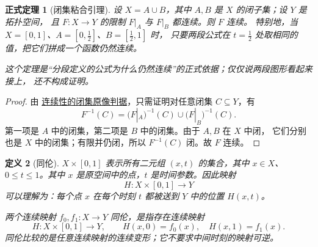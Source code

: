 \documentclass[UTF8,fontset=none,a4paper,11pt]{ctexart}
\theoremstyle{foundation-definition}
\newtheorem{definition}{定义}[section]
\theoremstyle{foundation-theorem}
\newtheorem{theorem}[definition]{正式定理}
\theoremstyle{foundation-proposition}
\theoremstyle{foundation-example}
\theoremstyle{foundation-remark}
\theoremstyle{foundation-theorem}
\newcommand{\term}[2]{\hyperref[#1]{#2}}
\begin{document}
\begin{theorem}[闭集粘合引理]
\label{thm:pasting-lemma}
设 $X=A\cup B$，其中 $A,B$ 是 $X$ 的闭子集；设 $Y$ 是拓扑空间，
且 $F:X\to Y$ 的限制 $F|_A$ 与 $F|_B$ 都连续。则 $F$ 连续。
特别地，当 $X=[0,1]$、$A=[0,\tfrac12]$、$B=[\tfrac12,1]$ 时，
只要两段公式在 $t=\tfrac12$ 处取相同的值，把它们拼成一个函数仍然连续。

这个定理是“分段定义的公式为什么仍然连续”的正式依据；仅仅说两段图形看起来接上，
还不构成证明。
\end{theorem}

\begin{proof}
由 \term{prop:continuous-closed-preimage}{连续性的闭集原像判据}，只需证明对任意闭集 $C\subseteq Y$，有
\[
 F^{-1}(C)=\bigl(F|_A\bigr)^{-1}(C)\cup\bigl(F|_B\bigr)^{-1}(C).
\]
第一项是 $A$ 中的闭集，第二项是 $B$ 中的闭集。由于 $A,B$ 在 $X$ 中闭，
它们分别也是 $X$ 中的闭集；有限并仍闭，所以 $F^{-1}(C)$ 闭。故 $F$ 连续。
\end{proof}

\begin{definition}[同伦]\label{def:homotopy}
\(X\times[0,1]\) 表示所有二元组 \((x,t)\) 的集合，其中 \(x\in X\)、\(0\leq t\leq1\)。其中 \(x\) 是原空间中的点，\(t\) 是时间参数。因此映射
\[
H:X\times[0,1]\to Y
\]
可以理解为：每个点 \(x\) 在每个时刻 \(t\) 都被送到 \(Y\) 中的位置 \(H(x,t)\)。

两个连续映射 \(f_0,f_1:X\to Y\) 同伦，是指存在连续映射
\[
H:X\times[0,1]\to Y,\qquad H(x,0)=f_0(x),\quad H(x,1)=f_1(x).
\]
同伦比较的是任意连续映射的连续变形；它不要求中间时刻的映射可逆。
\end{definition}
\end{document}
